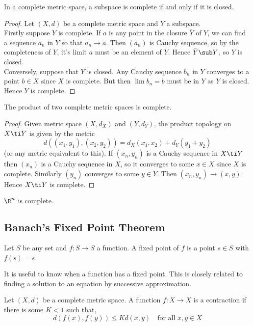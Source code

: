 
\noindent
\begin{nlemma}
  In a complete metric space, a subspace is complete if and only if it is closed.
\end{nlemma}
\begin{proof}
  Let $(X, d)$ be a complete metric space and $Y$ a subspace. \\
  Firstly suppose $Y$ is complete. If $a$ is any point in the closure $\bar Y$ of $Y$, we can find a sequence $a_n$ in $Y$ so that $a_n \to a$. Then $(a_n)$ is Cauchy sequence, so by the completeness of $Y$, it's limit $a$ must be an element of $Y$. Hence $\bar Y \sub Y$, so $Y$ is closed.\\

  \noindent
  Conversely, suppose that $Y$ is closed. Any Cauchy sequence $b_n$ in $Y$ converges to a point $b \in X$ since $X$ is complete. But then $\lim b_n = b$ must be in $Y$ as $Y$ is closed. Hence $Y$ is complete.
\end{proof}

\begin{nlemma}
  The product of two complete metric spaces is complete.
\end{nlemma}
\begin{proof}
  Given metric space $(X, d_X)$ and $(Y, d_Y)$, the product topology on $X \ti Y$ is given by the metric
  $$ d((x_1, y_1), (x_2, y_2)) = d_X(x_1, x_2) + d_Y(y_1 + y_2) $$
  (or any metric equivalent to this). If $(x_n, y_n)$ is a Cauchy sequence in $X \ti Y$ then $(x_n)$ is a Cauchy sequence in $X$, so it converges to some $x \in X$ since $X$ is complete. Similarly $(y_n)$ converges to some $y \in Y$. Then $(x_n, y_n) \to (x, y)$. Hence $X \ti Y$ is complete.
\end{proof}

\begin{eg}
  $\R^n$ is complete.
\end{eg}

\subsection{Banach's Fixed Point Theorem}
\begin{ndefi}
  Let $S$ be any set and $f : S \to S$ a function. A fixed point of $f$ is a point $s \in S$ with $f(s) = s$.
\end{ndefi}

\noindent
It is useful to know when a function has a fixed point. This is closely related to finding a solution to an equation by successive approximation.
\begin{ndefi}[Contraction]
  Let $(X, d)$ be a complete metric space. A function $f: X \to X$ is a contraction if there is some $K < 1$ such that,
  $$ d(f(x), f(y)) \le Kd(x, y) \quad \text{for all }x, y \in X $$
\end{ndefi}

